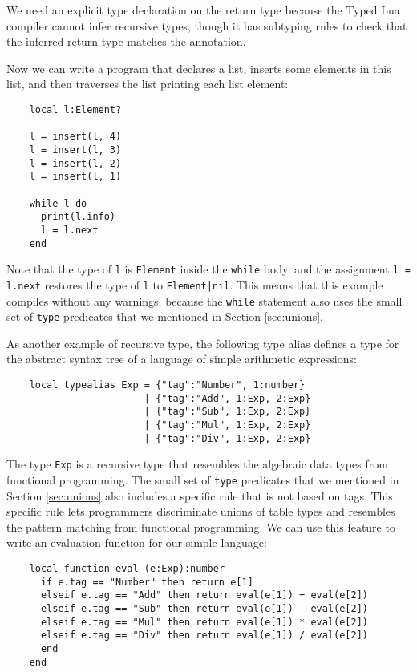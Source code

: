 We need an explicit type declaration on the return type because
the Typed Lua compiler cannot infer recursive types, though
it has subtyping rules to check that the inferred return type
matches the annotation.

Now we can write a program that declares a list, inserts some
elements in this list, and then traverses the list printing
each list element:
\begin{verbatim}
    local l:Element?

    l = insert(l, 4)
    l = insert(l, 3)
    l = insert(l, 2)
    l = insert(l, 1)

    while l do
      print(l.info)
      l = l.next
    end
\end{verbatim}

Note that the type of \texttt{l} is \texttt{Element} inside
the \texttt{while} body, and the assignment \texttt{l = l.next}
restores the type of \texttt{l} to \texttt{Element|nil}.
This means that this example compiles without any warnings, because the
\texttt{while} statement also uses the small set of \texttt{type}
predicates that we mentioned in Section \ref{sec:unions}.

As another example of recursive type, the following type alias
defines a type for the abstract syntax tree of a language of simple
arithmetic expressions:
\begin{verbatim}
    local typealias Exp = {"tag":"Number", 1:number}
                        | {"tag":"Add", 1:Exp, 2:Exp}
                        | {"tag":"Sub", 1:Exp, 2:Exp}
                        | {"tag":"Mul", 1:Exp, 2:Exp}
                        | {"tag":"Div", 1:Exp, 2:Exp}
\end{verbatim}

The type \texttt{Exp} is a recursive type that resembles the
algebraic data types from functional programming.
The small set of \texttt{type} predicates that we mentioned
in Section \ref{sec:unions} also includes a specific rule
that is not based on tags.
This specific rule lets programmers discriminate unions of table types
and resembles the pattern matching from functional programming.
We can use this feature to write an evaluation function for
our simple language:
\begin{verbatim}
    local function eval (e:Exp):number
      if e.tag == "Number" then return e[1]
      elseif e.tag == "Add" then return eval(e[1]) + eval(e[2])
      elseif e.tag == "Sub" then return eval(e[1]) - eval(e[2])
      elseif e.tag == "Mul" then return eval(e[1]) * eval(e[2])
      elseif e.tag == "Div" then return eval(e[1]) / eval(e[2])
      end
    end
\end{verbatim}

